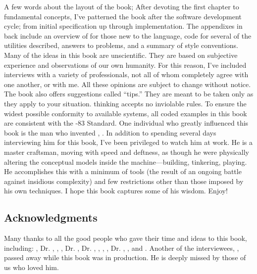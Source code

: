 A few words about the layout of the book; After devoting the first
chapter to fundamental concepts, I've patterned the book after the
software development cycle; from initial specification up through
implementation. The appendixes in back include an overview of \Forth{}
for those new to the language, code for several of the utilities described,
answers to problems, and a summary of style conventions. Many of the
ideas in this book are unscientific. They are based on subjective
experience and observations of our own humanity. For this reason,
I've included interviews with a variety of \Forth{} professionals, not
all of whom completely agree with one another, or with me. All these
opinions are subject to change without notice. The book also offers
suggestions called ``tips.'' They are meant to be taken only as they
apply to your situation. \Forth{} thinking accepts no inviolable rules.
To ensure the widest possible conformity to available \Forth{} systems,
all coded examples in this book are consistent with the \Forth{}-83 Standard.
One individual who greatly influenced this book is the man who invented
\Forth{}, . In addition to spending several days interviewing
him for this book, I've been privileged to watch him at work. He is
a master craftsman, moving with speed and deftness, as though he were
physically altering the conceptual models inside the machine---building,
tinkering, playing. He accomplishes this with a minimum of tools (the
result of an ongoing battle against insidious complexity) and few
restrictions other than those imposed by his own techniques. I hope
this book captures some of his wisdom. Enjoy!


\subsection{Acknowledgments}

Many thanks to all the good people who gave their time and ideas to
this book, including: , Dr. , , ,
Dr. , Dr. , , , ,
Dr. , , and . Another of the interviewees, , passed
away while this book was in production. He is deeply missed by those
of us who loved him.

